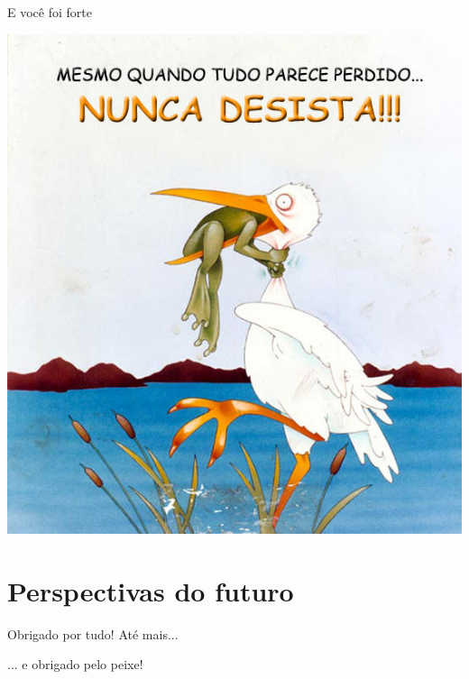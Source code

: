 \documentclass{beamer}
\begin{document}
\begin{frame}{E você foi forte}
  \begin{center}
    \includegraphics[height=.75\textheight]{Encerramento/naodesista3}

    \vfill
  \end{center}
\end{frame}

\section{Perspectivas do futuro}

\begin{frame}{\scriptsize }
  \begin{center}
    Obrigado por tudo! Até mais...

    \bigskip
    \bigskip
    ... e obrigado pelo peixe!
  \end{center}
\end{frame}
\end{document}

